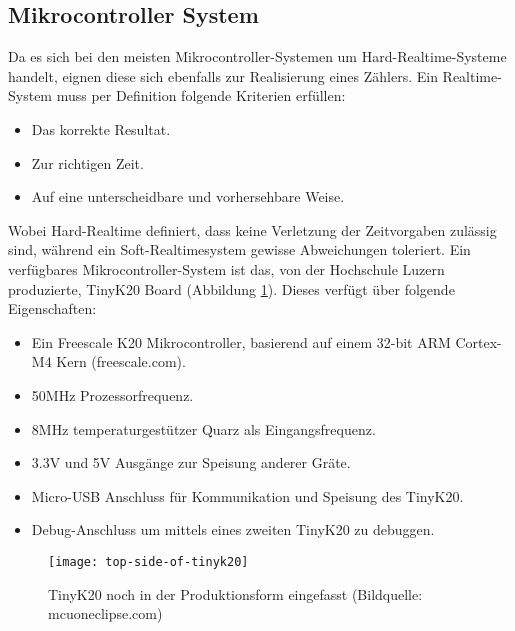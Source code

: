 	\subsection{Mikrocontroller System}
   		Da es sich bei den meisten Mikrocontroller-Systemen um Hard-Realtime-Systeme handelt, eignen diese sich ebenfalls zur Realisierung eines Zählers. Ein Realtime-System muss per Definition folgende Kriterien erfüllen:
   		\begin{itemize}
   			\item Das korrekte Resultat.
   			\item Zur richtigen Zeit.
   			\item Auf eine unterscheidbare und vorhersehbare Weise.
		\end{itemize}
		Wobei Hard-Realtime definiert, dass keine Verletzung der Zeitvorgaben zulässig sind, während ein Soft-Realtimesystem gewisse Abweichungen toleriert. Ein verfügbares Mikrocontroller-System ist das, von der Hochschule Luzern produzierte, TinyK20 Board (Abbildung \ref{fig:TinyK20}). Dieses verfügt über folgende Eigenschaften:
		\begin{itemize}
			\item Ein Freescale K20 Mikrocontroller, basierend auf einem  32-bit ARM Cortex-M4 Kern (freescale.com).
			\item 50MHz Prozessorfrequenz.
			\item 8MHz temperaturgestützer Quarz als Eingangsfrequenz.
			\item 3.3V und 5V Ausgänge zur Speisung anderer Gräte.
			\item Micro-USB Anschluss für Kommunikation und Speisung des TinyK20.
			\item Debug-Anschluss um mittels eines zweiten TinyK20 zu debuggen.
		\end{itemize}
		\begin{figure}[H]
        	\centering
        	\texttt{[image: top-side-of-tinyk20]}
        	\caption{TinyK20 noch in der Produktionsform eingefasst (Bildquelle: mcuoneclipse.com)}
        	\label{fig:TinyK20}
    	\end{figure}
